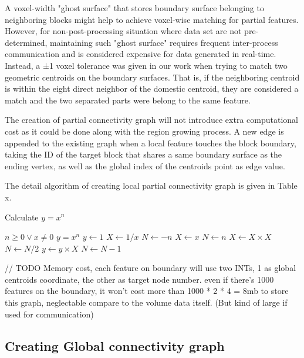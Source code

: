 \documentclass[10pt, conference, compsocconf]{IEEEtran}
\begin{document}
A voxel-width "ghost surface" that stores boundary surface belonging to neighboring blocks might help to achieve voxel-wise matching for partial features. However, for non-post-processing situation where data set are not pre-determined, maintaining such "ghost surface" requires frequent inter-process communication and is considered expensive for data generated in real-time. Instead, a ±1 voxel tolerance was given in our work when trying to match two geometric centroids on the boundary surfaces. That is, if the neighboring centroid is within the eight direct neighbor of the domestic centroid, they are considered a match and the two separated parts were belong to the same feature.

The creation of partial connectivity graph will not introduce extra computational cost as it could be done along with the region growing process. A new edge is appended to the existing graph when a local feature touches the block boundary, taking the ID of the target block that shares a same boundary surface as the ending vertex, as well as the global index of the centroids point as edge value.

The detail algorithm of creating local partial connectivity graph is given in Table x.

\begin{algorithm}
\caption{Calculate $y = x^n$}
\begin{algorithmic} 
\REQUIRE $n \geq 0 \vee x \neq 0$
\ENSURE $y = x^n$
\STATE $y \leftarrow 1$
\STATE $X \leftarrow 1 / x$
\STATE $N \leftarrow -n$
\ELSE
\STATE $X \leftarrow x$
\STATE $N \leftarrow n$
\ENDIF
{}
\STATE $X \leftarrow X \times X$
\STATE $N \leftarrow N / 2$
\ELSE[$N$ is odd]
\STATE $y \leftarrow y \times X$
\STATE $N \leftarrow N - 1$
\ENDIF
\ENDWHILE
\end{algorithmic}
\end{algorithm}

// TODO
Memory cost, each feature on boundary will use two INTs, 1 as global centroids coordinate, the other as target node number. even if there's 1000 features on the boundary, it won’t cost more than 1000 * 2 * 4 = 8mb to store this graph, neglectable compare to the volume data itself. (But kind of large if used for communication)

\subsection{Creating Global connectivity graph}
\end{document}
